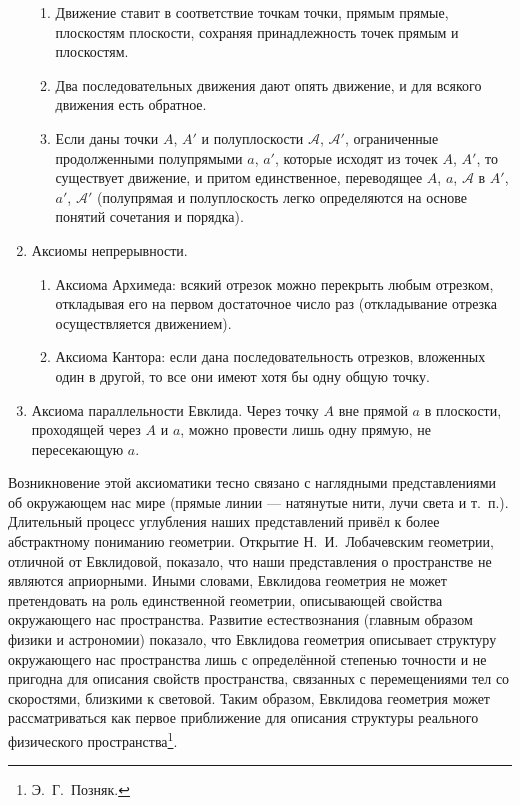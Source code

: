 \documentclass{article}
\begin{document}
\begin{enumerate}[label=\Roman*.]
\begin{enumerate}[noitemsep, parsep=0pt, topsep=0pt]
        \item Движение ставит в соответствие точкам точки, прямым прямые, плоскостям плоскости, сохраняя принадлежность точек прямым и плоскостям. 
        \item Два последовательных движения дают опять движение, и для всякого движения есть обратное. 
        \item Если даны точки $A$, $A'$ и полуплоскости $\mathcal{A}$, $\mathcal{A}'$, ограниченные продолженными полупрямыми $a$, $a'$, которые исходят из точек $A$, $A'$, то существует движение, и притом единственное, переводящее $A$, $a$, $\mathcal{A}$ в $A'$, $a'$, $\mathcal{A}'$ (полупрямая и полуплоскость легко определяются на основе понятий сочетания и порядка).
    \end{enumerate}
    \item Аксиомы непрерывности. 
    \begin{enumerate}[noitemsep, parsep=0pt, topsep=0pt] 
        \item Аксиома Архимеда: всякий отрезок можно перекрыть любым отрезком, откладывая его на первом достаточное число раз (откладывание отрезка осуществляется движением). 
        \item Аксиома Кантора: если дана последовательность отрезков, вложенных один в другой, то все они имеют хотя бы одну общую точку.
    \end{enumerate}
    \item Аксиома параллельности Евклида. Через точку $A$ вне прямой $a$ в плоскости, проходящей через $A$ и $a$, можно провести лишь одну прямую, не пересекающую $a$.
\end{enumerate}

Возникновение этой аксиоматики тесно связано с наглядными представлениями об окружающем нас мире (прямые линии --- натянутые нити, лучи света и т.~п.). Длительный процесс углубления наших представлений привёл к более абстрактному пониманию геометрии. Открытие Н.~И.~Лобачевским геометрии, отличной от Евклидовой, показало, что наши представления о пространстве не являются априорными. Иными словами, Евклидова геометрия не может претендовать на роль единственной геометрии, описывающей свойства окружающего нас пространства. Развитие естествознания (главным образом физики и астрономии) показало, что Евклидова геометрия описывает структуру окружающего нас пространства лишь с определённой степенью точности и не пригодна для описания свойств пространства, связанных с перемещениями тел со скоростями, близкими к световой. Таким образом, Евклидова геометрия может рассматриваться как первое приближение для описания структуры реального физического пространства\footnote{Э.~Г.~Позняк.}.
\end{document}
